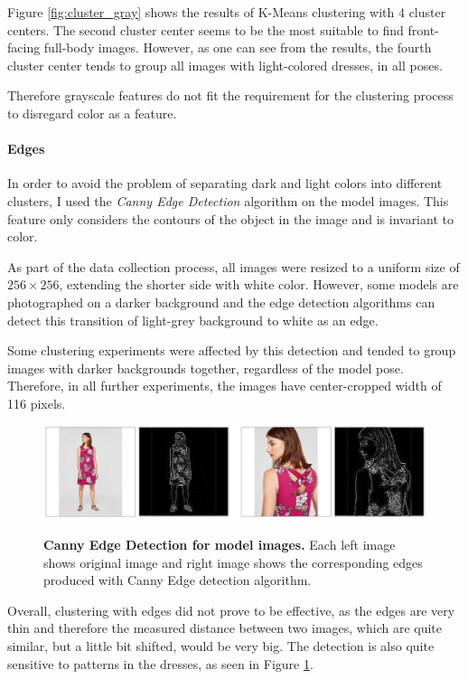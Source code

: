 \documentclass[12pt]{report}
\begin{document}
Figure \ref{fig:cluster_gray} shows the results of K-Means clustering with 4 cluster centers. The second cluster center seems to be the most suitable to find front-facing full-body images. However, as one can see from the results, the fourth cluster center tends to group all images with light-colored dresses, in all poses. 

Therefore grayscale features do not fit the requirement for the clustering process to disregard color as a feature.


\paragraph{Edges}
In order to avoid the problem of separating dark and light colors into different clusters, I used the \textit{Canny Edge Detection} algorithm on the model images. This feature only considers the contours of the object in the image and is invariant to color.

As part of the data collection process, all images were resized to a uniform size of $256\times256$, extending the shorter side with white color. However, some models are photographed on a darker background and the edge detection algorithms can detect this transition of light-grey background to white as an edge.

Some clustering experiments were affected by this detection and tended to group images with darker backgrounds together, regardless of the model pose. Therefore, in all further experiments, the images have center-cropped width of 116 pixels.

\begin{figure}[h]
\centering
{\includegraphics[width=\linewidth]{04_experiments/clustering/edges_data}}
\caption{\label{fig:cluster_edges_data} \textbf{Canny Edge Detection for model images.} Each left image shows original image and right image shows the corresponding edges produced with Canny Edge detection algorithm.}
\end{figure}

Overall, clustering with edges did not prove to be effective, as the edges are very thin and therefore the measured distance between two images, which are quite similar, but a little bit shifted, would be very big. The detection is also quite sensitive to patterns in the dresses, as seen in Figure \ref{fig:cluster_edges_data}.
\end{document}
